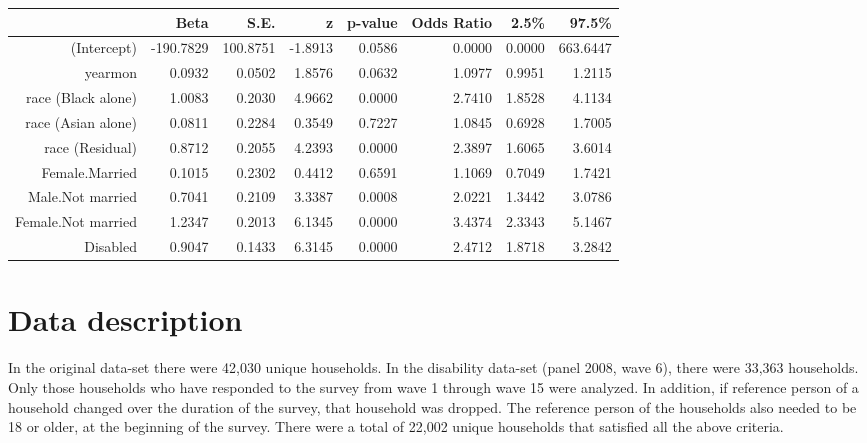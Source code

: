 \documentclass[11pt]{extarticle} %
\begin{document}
\begin{table}[H]
\centering
\begin{tabular}{rrrrrrrr}
  \hline
 & Beta & S.E. & z & p-value & Odds Ratio & 2.5\% & 97.5\% \\ 
  \hline
(Intercept) & -190.7829 & 100.8751 & -1.8913 & 0.0586 & 0.0000 & 0.0000 & 663.6447 \\ 
  yearmon & 0.0932 & 0.0502 & 1.8576 & 0.0632 & 1.0977 & 0.9951 & 1.2115 \\ 
  race (Black alone) & 1.0083 & 0.2030 & 4.9662 & 0.0000 & 2.7410 & 1.8528 & 4.1134 \\ 
  race (Asian alone) & 0.0811 & 0.2284 & 0.3549 & 0.7227 & 1.0845 & 0.6928 & 1.7005 \\ 
  race (Residual) & 0.8712 & 0.2055 & 4.2393 & 0.0000 & 2.3897 & 1.6065 & 3.6014 \\ 
  Female.Married & 0.1015 & 0.2302 & 0.4412 & 0.6591 & 1.1069 & 0.7049 & 1.7421 \\ 
  Male.Not married & 0.7041 & 0.2109 & 3.3387 & 0.0008 & 2.0221 & 1.3442 & 3.0786 \\ 
  Female.Not married & 1.2347 & 0.2013 & 6.1345 & 0.0000 & 3.4374 & 2.3343 & 5.1467 \\ 
  Disabled & 0.9047 & 0.1433 & 6.3145 & 0.0000 & 2.4712 & 1.8718 & 3.2842 \\ 
  \hline
\end{tabular}
\end{table}

\section{Data description}
In the original data-set there were 42,030 unique households. In the disability data-set (panel 2008, wave 6), there were 33,363 households. Only those households who have responded to the survey from wave 1 through wave 15 were analyzed. In addition, if reference person of a household changed over the duration of the survey, that household was dropped. The reference person of the households also needed to be 18 or older, at the beginning of the survey. There were a total of 22,002 unique households that satisfied all the above criteria. 
\end{document}
